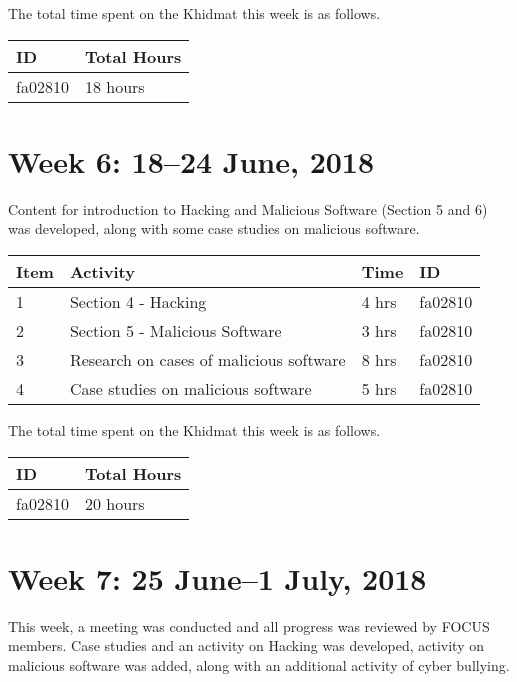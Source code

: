 \documentclass{article}
\begin{document}
The total time spent on the Khidmat this week is as follows. \newline

\begin{tabular}{|l|l|}
  \hline
  ID & Total Hours\\\hline\hline
  fa02810 & 18 hours\\\hline
\end{tabular}

\newpage %
\section*{Week 6: 18--24 June, 2018}

Content for introduction to Hacking and Malicious Software (Section 5 and 6) was developed, along with some case studies on malicious software. \newline

\begin{tabular}{|l|l|l|l|}
  \hline
  Item 	& Activity & Time & ID \\\hline\hline
  1	& Section 4 - Hacking & 4 hrs & fa02810 \\\hline
  2	& Section 5 - Malicious Software & 3 hrs & fa02810 \\\hline
  3 & Research on cases of malicious software & 8 hrs & fa02810 \\\hline
  4 & Case studies on malicious software & 5 hrs & fa02810 \\\hline
\end{tabular} \newline

The total time spent on the Khidmat this week is as follows. \newline

\begin{tabular}{|l|l|}
  \hline
  ID & Total Hours\\\hline\hline
  fa02810 & 20 hours\\\hline
\end{tabular}

\newpage %
\section*{Week 7: 25 June--1 July, 2018}

This week, a meeting was conducted and all progress was reviewed by FOCUS members. Case studies and an activity on Hacking was developed, activity on malicious software was added, along with an additional activity of cyber bullying. \newline
\end{document}
